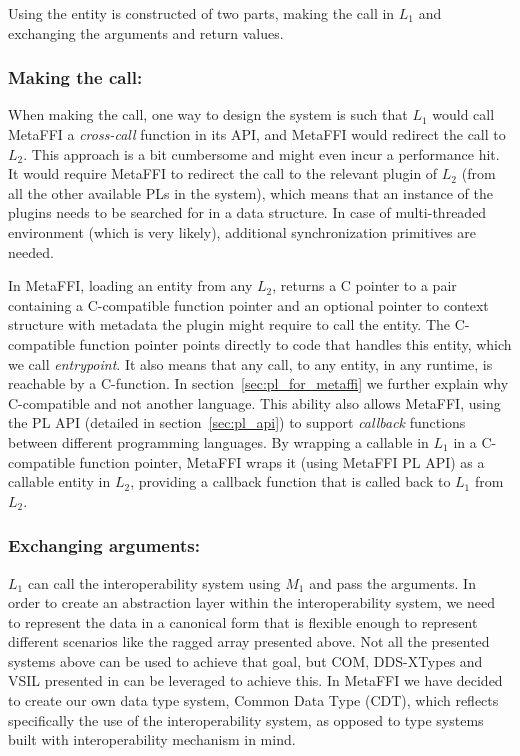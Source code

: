 \documentclass[sigplan,10pt,manuscript,nonacm]{acmart}
\begin{document}
Using the entity is constructed of two parts, making the call in $L_1$ and exchanging the arguments and return values.


\subsubsection{Making the call:} When making the call, one way to design the system is such that $L_1$ would call MetaFFI a \textit{cross-call} function in its API, and MetaFFI would redirect the call to $L_2$. This approach is a bit cumbersome and might even incur a performance hit. It would require MetaFFI to redirect the call to the relevant plugin of $L_2$ (from all the other available PLs in the system), which means that an instance of the plugins needs to be searched for in a data structure. In case of multi-threaded environment (which is very likely), additional synchronization primitives are needed.

In MetaFFI, loading an entity from any $L_2$, returns a C pointer to a pair containing a C-compatible function pointer and an optional pointer to context structure with metadata the plugin might require to call the entity. The C-compatible function pointer points directly to code that handles this entity, which we call \textit{entrypoint}. It also means that any call, to any entity, in any runtime, is reachable by a C-function. In section~\ref{sec:pl_for_metaffi} we further explain why C-compatible and not another language. This ability also allows MetaFFI, using the PL API (detailed in section~\ref{sec:pl_api}) to support \textit{callback} functions between different programming languages. By wrapping a callable in $L_1$ in a C-compatible function pointer, MetaFFI wraps it (using MetaFFI PL API) as a callable entity in $L_2$, providing a callback function that is called back to $L_1$ from $L_2$.

\subsubsection{Exchanging arguments:} $L_1$ can call the interoperability system using $M_1$ and pass the arguments. In order to create an abstraction layer within the interoperability system, we need to represent the data in a canonical form that is flexible enough to represent different scenarios like the ragged array presented above. Not all the presented systems above can be used to achieve that goal, but COM, DDS-XTypes and VSIL presented in \cite{toward_description_of_interop} can be leveraged to achieve this. In MetaFFI we have decided to create our own data type system, Common Data Type (CDT), which reflects specifically the use of the interoperability system, as opposed to type systems built with interoperability mechanism in mind.
\end{document}
